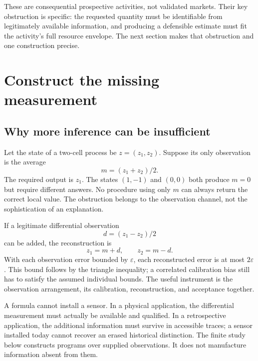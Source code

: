\documentclass[10pt,a4paper]{article}
\begin{document}
These are consequential prospective activities, not validated markets. Their key obstruction is specific: the requested quantity must be identifiable from legitimately available information, and producing a defensible estimate must fit the activity's full resource envelope. The next section makes that obstruction and one construction precise.

\section{Construct the missing measurement}\label{sec:measurement}

\subsection{Why more inference can be insufficient}

Let the state of a two-cell process be $z=(z_1,z_2)$. Suppose its only observation is the average
\begin{equation}
 m=(z_1+z_2)/2.
\end{equation}
The required output is $z_1$. The states $(1,-1)$ and $(0,0)$ both produce $m=0$ but require different answers. No procedure using only $m$ can always return the correct local value. The obstruction belongs to the observation channel, not the sophistication of an explanation.

If a legitimate differential observation
\begin{equation}
 d=(z_1-z_2)/2
\end{equation}
can be added, the reconstruction is
\begin{equation}
 z_1=m+d,\qquad z_2=m-d.
\label{eq:two}
\end{equation}
With each observation error bounded by $\varepsilon$, each reconstructed error is at most $2\varepsilon$. This bound follows by the triangle inequality; a correlated calibration bias still has to satisfy the assumed individual bounds. The useful instrument is the observation arrangement, its calibration, reconstruction, and acceptance together.

A formula cannot install a sensor. In a physical application, the differential measurement must actually be available and qualified. In a retrospective application, the additional information must survive in accessible traces; a sensor installed today cannot recover an erased historical distinction. The finite study below constructs programs over supplied observations. It does not manufacture information absent from them.
\end{document}
